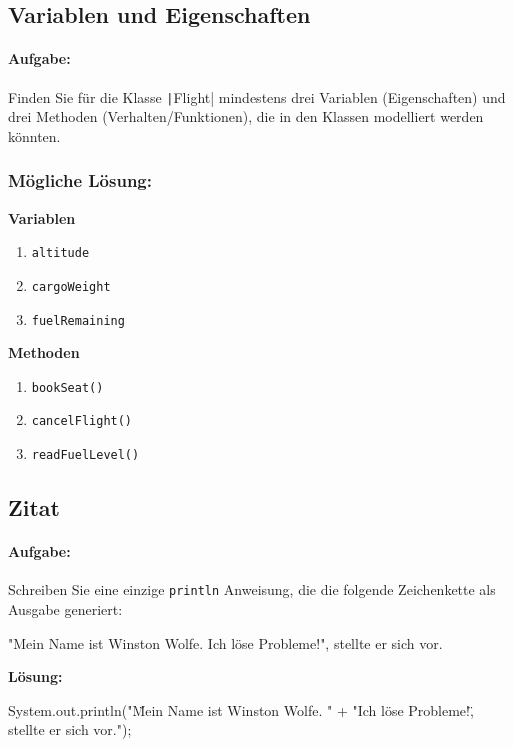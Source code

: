 \documentclass[a4paper,10pt, dvipsnames]{report}
\begin{document}
\subsection{Variablen und Eigenschaften}

\paragraph{Aufgabe:}
Finden Sie für die Klasse \texttt|Flight| mindestens drei Variablen (Eigenschaften) und drei Methoden (Verhalten/Funktionen), die in den Klassen modelliert werden könnten.

\subsubsection{Mögliche Lösung:}
\textbf{Variablen}
\begin{enumerate}
    \item \texttt{altitude}
    \item \texttt{cargoWeight}
    \item \texttt{fuelRemaining}
\end{enumerate}
\textbf{Methoden}
\begin{enumerate}
    \item \texttt{bookSeat()}
    \item \texttt{cancelFlight()}
    \item \texttt{readFuelLevel()}
\end{enumerate}

\subsection{Zitat}

\paragraph{Aufgabe:}
Schreiben Sie eine einzige \texttt{println} Anweisung, die die folgende Zeichenkette als Ausgabe generiert:
\begin{textcodebox}
"Mein Name ist Winston Wolfe.
Ich löse Probleme!", stellte er sich vor.
\end{textcodebox}

\textbf{Lösung:}

\begin{javacodebox}
System.out.println("\"Mein Name ist Winston Wolfe. \n" +
    "Ich löse Probleme!\", stellte er sich vor.");
\end{javacodebox}
\end{document}
